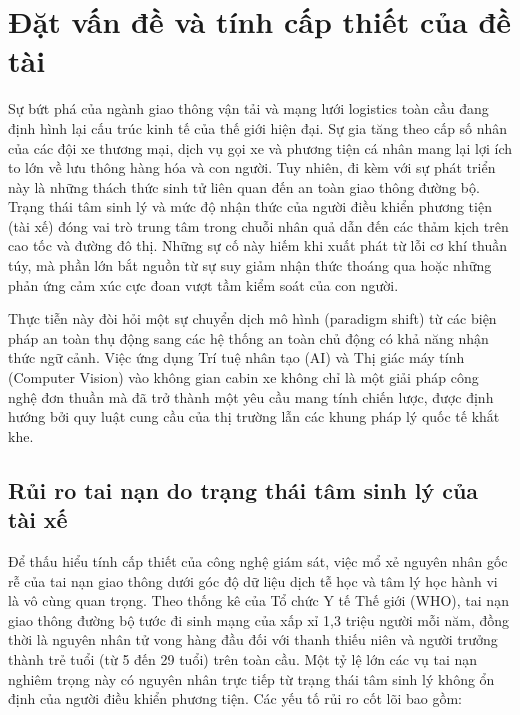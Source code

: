 \documentclass[../DoAn.tex]{subfiles}
\begin{document}
\section{Đặt vấn đề và tính cấp thiết của đề tài}
\label{section:1.1}
Sự bứt phá của ngành giao thông vận tải và mạng lưới logistics toàn cầu đang định hình lại cấu trúc kinh tế của thế giới hiện đại. Sự gia tăng theo cấp số nhân của các đội xe thương mại, dịch vụ gọi xe và phương tiện cá nhân mang lại lợi ích to lớn về lưu thông hàng hóa và con người. Tuy nhiên, đi kèm với sự phát triển này là những thách thức sinh tử liên quan đến an toàn giao thông đường bộ. Trạng thái tâm sinh lý và mức độ nhận thức của người điều khiển phương tiện (tài xế) đóng vai trò trung tâm trong chuỗi nhân quả dẫn đến các thảm kịch trên cao tốc và đường đô thị. Những sự cố này hiếm khi xuất phát từ lỗi cơ khí thuần túy, mà phần lớn bắt nguồn từ sự suy giảm nhận thức thoáng qua hoặc những phản ứng cảm xúc cực đoan vượt tầm kiểm soát của con người.

Thực tiễn này đòi hỏi một sự chuyển dịch mô hình (paradigm shift) từ các biện pháp an toàn thụ động sang các hệ thống an toàn chủ động có khả năng nhận thức ngữ cảnh. Việc ứng dụng Trí tuệ nhân tạo (AI) và Thị giác máy tính (Computer Vision) vào không gian cabin xe không chỉ là một giải pháp công nghệ đơn thuần mà đã trở thành một yêu cầu mang tính chiến lược, được định hướng bởi quy luật cung cầu của thị trường lẫn các khung pháp lý quốc tế khắt khe.

\subsection{Rủi ro tai nạn do trạng thái tâm sinh lý của tài xế}
Để thấu hiểu tính cấp thiết của công nghệ giám sát, việc mổ xẻ nguyên nhân gốc rễ của tai nạn giao thông dưới góc độ dữ liệu dịch tễ học và tâm lý học hành vi là vô cùng quan trọng. Theo thống kê của Tổ chức Y tế Thế giới (WHO), tai nạn giao thông đường bộ tước đi sinh mạng của xấp xỉ 1,3 triệu người mỗi năm, đồng thời là nguyên nhân tử vong hàng đầu đối với thanh thiếu niên và người trưởng thành trẻ tuổi (từ 5 đến 29 tuổi) trên toàn cầu. Một tỷ lệ lớn các vụ tai nạn nghiêm trọng này có nguyên nhân trực tiếp từ trạng thái tâm sinh lý không ổn định của người điều khiển phương tiện. Các yếu tố rủi ro cốt lõi bao gồm:
\end{document}
